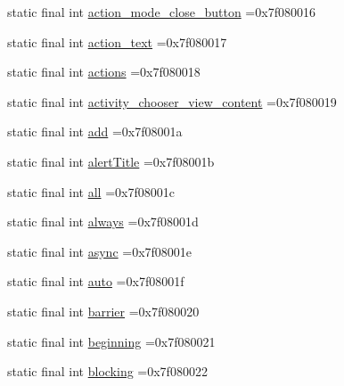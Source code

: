 \begin{DoxyCompactItemize}
static final int \mbox{\hyperlink{classcom_1_1example_1_1trainawearapplication_1_1_r_1_1id_a54407b6c97eea70df63fadc1bcdba8a5}{action\+\_\+mode\+\_\+close\+\_\+button}} =0x7f080016
\item 
static final int \mbox{\hyperlink{classcom_1_1example_1_1trainawearapplication_1_1_r_1_1id_a6cd80a65990deae4eafca67d5211f31f}{action\+\_\+text}} =0x7f080017
\item 
static final int \mbox{\hyperlink{classcom_1_1example_1_1trainawearapplication_1_1_r_1_1id_a0d7762871bed6af7aba9440ae1335349}{actions}} =0x7f080018
\item 
static final int \mbox{\hyperlink{classcom_1_1example_1_1trainawearapplication_1_1_r_1_1id_aeec633d954302b5328a5a64795c10e8a}{activity\+\_\+chooser\+\_\+view\+\_\+content}} =0x7f080019
\item 
static final int \mbox{\hyperlink{classcom_1_1example_1_1trainawearapplication_1_1_r_1_1id_af136009b670dbb7a8e938defb4f36053}{add}} =0x7f08001a
\item 
static final int \mbox{\hyperlink{classcom_1_1example_1_1trainawearapplication_1_1_r_1_1id_af6ae44e7c2f558fd3f5597cb9372e41c}{alert\+Title}} =0x7f08001b
\item 
static final int \mbox{\hyperlink{classcom_1_1example_1_1trainawearapplication_1_1_r_1_1id_a10f6a64bc346559fbe66518a02fd2639}{all}} =0x7f08001c
\item 
static final int \mbox{\hyperlink{classcom_1_1example_1_1trainawearapplication_1_1_r_1_1id_ac8b12d3937807d450f91d9fa8a60b2e3}{always}} =0x7f08001d
\item 
static final int \mbox{\hyperlink{classcom_1_1example_1_1trainawearapplication_1_1_r_1_1id_aa3f4a9e5cad114d08be4395bad8b6c5a}{async}} =0x7f08001e
\item 
static final int \mbox{\hyperlink{classcom_1_1example_1_1trainawearapplication_1_1_r_1_1id_a4200f03a9fd397850fa13d4d105ab21e}{auto}} =0x7f08001f
\item 
static final int \mbox{\hyperlink{classcom_1_1example_1_1trainawearapplication_1_1_r_1_1id_a5f7d9c16b722ed4cf46b077528f3c9a8}{barrier}} =0x7f080020
\item 
static final int \mbox{\hyperlink{classcom_1_1example_1_1trainawearapplication_1_1_r_1_1id_ab2581750e16d6b5ddccc1a39757e4cd9}{beginning}} =0x7f080021
\item 
static final int \mbox{\hyperlink{classcom_1_1example_1_1trainawearapplication_1_1_r_1_1id_a2b505ccda7f7c98da2c29aec1b59412b}{blocking}} =0x7f080022
\item 

\end{DoxyCompactItemize}
